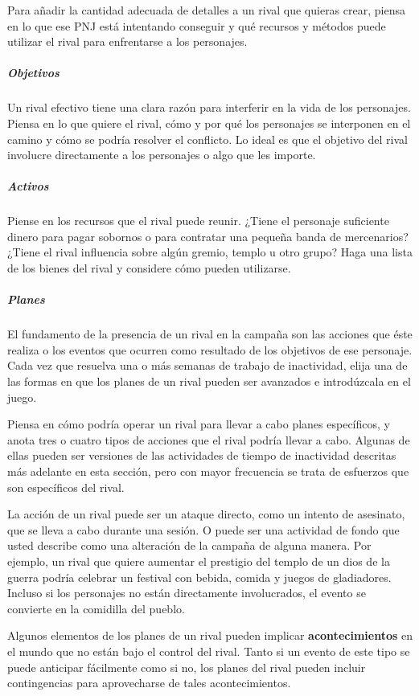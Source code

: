 \documentclass[a4paper,twocolumn,openany,10pt]{dndbook}
\begin{document}
Para añadir la cantidad adecuada de detalles a un rival que quieras crear, piensa en lo que ese PNJ está intentando conseguir y
qué recursos y métodos puede utilizar el rival para enfrentarse a los personajes.

\subparagraph{Objetivos} Un rival efectivo tiene una clara razón para interferir en la vida de los personajes. Piensa en lo que
quiere el rival, cómo y por qué los personajes se interponen en el camino y cómo se podría resolver el conflicto. Lo ideal es
que el objetivo del rival involucre directamente a los personajes o algo que les importe. 

\subparagraph{Activos} Piense en los recursos que el rival puede reunir. ¿Tiene el personaje suficiente dinero para pagar
sobornos o para contratar una pequeña banda de mercenarios? ¿Tiene el rival influencia sobre algún gremio, templo u otro grupo?
Haga una lista de los bienes del rival y considere cómo pueden utilizarse.

\subparagraph{Planes} El fundamento de la presencia de un rival en la campaña son las acciones que éste realiza o los eventos
que ocurren como resultado de los objetivos de ese personaje. Cada vez que resuelva una o más semanas de trabajo de inactividad,
elija una de las formas en que los planes de un rival pueden ser avanzados e introdúzcala en el juego.

Piensa en cómo podría operar un rival para llevar a cabo planes específicos, y anota tres o cuatro tipos de acciones que el
rival podría llevar a cabo. Algunas de ellas pueden ser versiones de las actividades de tiempo de inactividad descritas más
adelante en esta sección, pero con mayor frecuencia se trata de esfuerzos que son específicos del rival.

La acción de un rival puede ser un ataque directo, como un intento de asesinato, que se lleva a cabo durante una sesión. O puede
ser una actividad de fondo que usted describe como una alteración de la campaña de alguna manera. Por ejemplo, un rival que
quiere aumentar el prestigio del templo de un dios de la guerra podría celebrar un festival con bebida, comida y juegos de
gladiadores. Incluso si los personajes no están directamente involucrados, el evento se convierte en la comidilla del pueblo.

Algunos elementos de los planes de un rival pueden implicar \textbf{acontecimientos} en el mundo que no están bajo el control
del rival. Tanto si un evento de este tipo se puede anticipar fácilmente como si no, los planes del rival pueden incluir
contingencias para aprovecharse de tales acontecimientos. 
\end{document}

